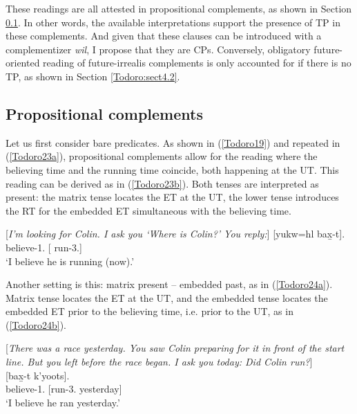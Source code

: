 \documentclass[output=paper]{langscibook}
\begin{document}
 These readings are all attested in propositional complements, as shown in Section \ref{Todoro:sect4.1}. In other words, the available interpretations support the presence of TP
  in these complements. And given that these clauses can be introduced with a complementizer \emph{wil}, I propose that they are CPs. Conversely, obligatory future-oriented reading of future-irrealis complements is only accounted for if there is no TP, as shown in Section \ref{Todoro:sect4.2}.
 
 \subsection{Propositional complements}\label{Todoro:sect4.1}
 
 Let us first consider bare predicates. As shown in (\ref{Todoro19}) and repeated in (\ref{Todoro23a}), propositional complements allow for the reading where the believing time and the running time coincide, both happening at the UT. This reading can be derived as in (\ref{Todoro23b}). Both tenses are interpreted as present: the matrix tense locates the ET at the UT, the lower tense introduces the RT for the embedded ET simultaneous with the believing time. 

\begin{exe}
\ex \label{Todoro23}
\begin{xlist}

\ex \label{Todoro23a} [\emph{I’m looking for Colin. I ask you ‘Where is Colin?’ You reply:}]
 	[{yukw=hl}		{bax̱-t}]. \\
    believe-1{\sg}.{\seriesII}	[		run-3.{\seriesII}] \\
\glt ‘I believe he is running (now).’ 

\ex \label{Todoro23b}

\end{xlist}
\end{exe}

Another setting is this: matrix present – embedded past, as in (\ref{Todoro24a}). Matrix tense locates the ET at the UT, and the embedded tense locates the embedded ET prior to the believing time, i.e. prior to the UT, as in (\ref{Todoro24b}).

\begin{exe}
\ex \label{Todoro24}
\begin{xlist}

\ex \label{Todoro24a} [\emph{There was a race yesterday. You saw Colin preparing for it in       
     front of the start line. But you left before the race began. I ask you   
    today: Did Colin run?}]\\
 	[{bax̱-t} {k'yoots}]. \\
    believe-1{\sg}.{\seriesII}	[run-3.{\seriesII} yesterday] \\
\glt ‘I believe he ran yesterday.’ 

\ex \label{Todoro24b}

\end{xlist}
\end{exe}
\end{document}
